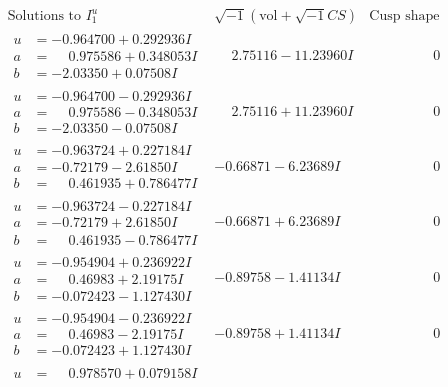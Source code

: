 \documentclass[1p]{elsarticle_modified}
\theoremstyle{definition}
\newcommand{\I}{\sqrt{-1}}
\begin{document}
$$\begin{array}{c|c|c}  
\text{Solutions to }I^u_{1}& \I (\text{vol} + \sqrt{-1}CS) & \text{Cusp shape}\\
 \hline 
\begin{aligned}
u &= -0.964700 + 0.292936 I \\
a &= \phantom{-}0.975586 + 0.348053 I \\
b &= -2.03350 + 0.07508 I\end{aligned}
 & \phantom{-}2.75116 - 11.23960 I & \phantom{-0.000000 } 0 \\ \hline\begin{aligned}
u &= -0.964700 - 0.292936 I \\
a &= \phantom{-}0.975586 - 0.348053 I \\
b &= -2.03350 - 0.07508 I\end{aligned}
 & \phantom{-}2.75116 + 11.23960 I & \phantom{-0.000000 } 0 \\ \hline\begin{aligned}
u &= -0.963724 + 0.227184 I \\
a &= -0.72179 - 2.61850 I \\
b &= \phantom{-}0.461935 + 0.786477 I\end{aligned}
 & -0.66871 - 6.23689 I & \phantom{-0.000000 } 0 \\ \hline\begin{aligned}
u &= -0.963724 - 0.227184 I \\
a &= -0.72179 + 2.61850 I \\
b &= \phantom{-}0.461935 - 0.786477 I\end{aligned}
 & -0.66871 + 6.23689 I & \phantom{-0.000000 } 0 \\ \hline\begin{aligned}
u &= -0.954904 + 0.236922 I \\
a &= \phantom{-}0.46983 + 2.19175 I \\
b &= -0.072423 - 1.127430 I\end{aligned}
 & -0.89758 - 1.41134 I & \phantom{-0.000000 } 0 \\ \hline\begin{aligned}
u &= -0.954904 - 0.236922 I \\
a &= \phantom{-}0.46983 - 2.19175 I \\
b &= -0.072423 + 1.127430 I\end{aligned}
 & -0.89758 + 1.41134 I & \phantom{-0.000000 } 0 \\ \hline\begin{aligned}
u &= \phantom{-}0.978570 + 0.079158 I \\

\end{aligned}
\end{array}$$
\end{document}
